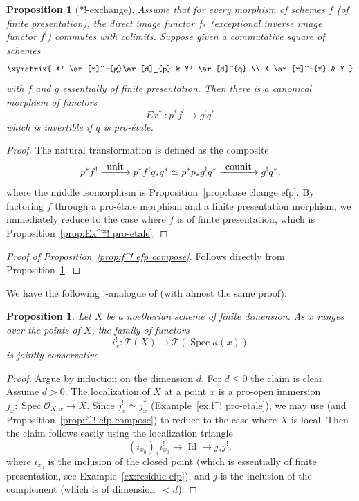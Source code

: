 \documentclass[JEP,XML,SOM,Unicode]{cedram}
\def\To#1{\mathchoice{\xrightarrow{\textstyle\kern4pt#1\kern3pt}}{\stackrel{#1}{\longrightarrow}}{}{}}
\newcommand{\T}{\mathscr T}
\DeclareMathOperator{\Id}{Id}
\DeclareMathOperator{\spec}{Spec}
\newcommand{\OO}{\mathcal O}
\newtheorem{prop}[thm]{Proposition}
\theoremstyle{remark}
\theoremstyle{definition}
\numberwithin{equation}{thm}
\begin{document}
\begin{prop}[$*!$-exchange]\label{prop:Ex^*! efp}
Assume that for every morphism of schemes $f$ (\resp of finite presentation), the direct image functor $f_*$ (\resp exceptional inverse image functor $f^!$) commutes with colimits.
Suppose given a commutative square of schemes
\[
\xymatrix{
X' \ar[r]^-{g}\ar[d]_{p}
& Y' \ar[d]^{q}
\\
X \ar[r]^-{f}
& Y
}
\]
with $f$ and $g$ essentially of finite presentation.
Then there is a canonical morphism of functors
\[
Ex^{*!} : p^*f^! \to g^!q^*
\]
which is invertible if $q$ is pro-étale.
\end{prop}
\begin{proof}
The natural transformation is defined as the composite
\[
p^*f^!
\To{\mathrm{unit}} p^*f^!q_*q^*
\simeq p^*p_*g^!q^*
\To{\mathrm{counit}}
g^!q^*,
\]
where the middle isomorphism is Proposition~\ref{prop:base change efp}.
By factoring $f$ through a pro-étale morphism and a finite presentation morphism, we immediately reduce to the case where $f$ is of finite presentation, which is Proposition~\ref{prop:Ex^*! pro-etale}.
\end{proof}

\begin{proof}[Proof of Proposition~\ref{prop:f^! efp compose}]
Follows directly from Proposition~\ref{prop:Ex^*! efp}.
\end{proof}

We have the following $!$-analogue of \cite[Cor.\,4.3.17]{CD3} (with almost the same proof):

\begin{prop}\label{prop:shriek conservative}
Let $X$ be a noetherian scheme of finite dimension.
As $x$ ranges over the points of $X$, the family of functors
\[
i_x^! : \T(X) \to \T(\spec{\kappa(x)})
\]
is jointly conservative.
\end{prop}
\begin{proof}
Argue by induction on the dimension $d$.
For $d\leqslant 0$ the claim is clear.
Assume $d>0$.
The localization of $X$ at a point $x$ is a pro-open immersion \hbox{$j_x : \spec{\OO_{X,x}} \to X$}.
Since $j_x^! \simeq j_x^*$ (Example~\ref{ex:f^! pro-etale}), we may use \cite[Prop.\,4.3.9]{CD3} (and Proposition~\ref{prop:f^! efp compose}) to reduce to the case where $X$ is local.
Then the claim follows easily using the localization triangle
\[
(i_{x_0})_*i_{x_0}^! \to \Id \to j_*j^!,
\]
where $i_{x_0}$ is the inclusion of the closed point (which is essentially of finite presentation, see Example~\ref{ex:residue efp}), and $j$ is the inclusion of the complement (which is of dimension~\hbox{$< d$}).
\end{proof}
\end{document}
